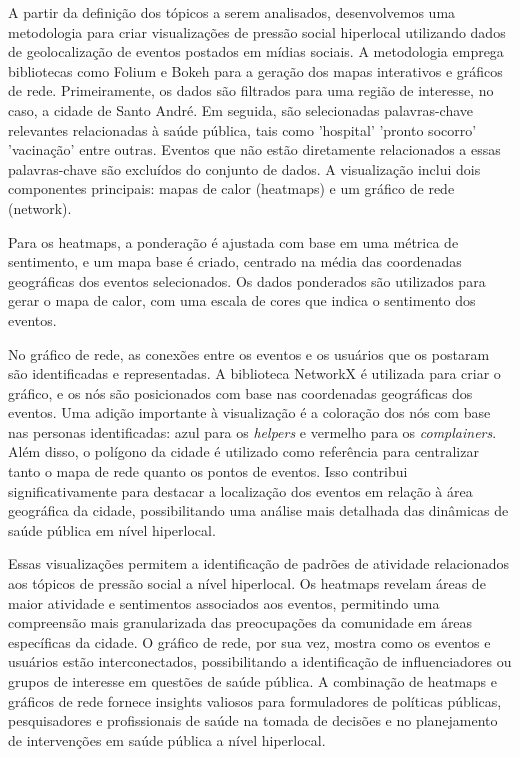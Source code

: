A partir da definição dos tópicos a serem analisados, desenvolvemos uma metodologia para criar visualizações de pressão social hiperlocal utilizando dados de geolocalização de eventos postados em mídias sociais. A metodologia emprega bibliotecas como Folium e Bokeh para a geração dos mapas interativos e gráficos de rede. Primeiramente, os dados são filtrados para uma região de interesse, no caso, a cidade de Santo André. Em seguida, são selecionadas palavras-chave relevantes relacionadas à saúde pública, tais como 'hospital' 'pronto socorro' 'vacinação' entre outras. Eventos que não estão diretamente relacionados a essas palavras-chave são excluídos do conjunto de dados. A visualização inclui dois componentes principais: mapas de calor (heatmaps) e um gráfico de rede (network).

Para os heatmaps, a ponderação é ajustada com base em uma métrica de sentimento, e um mapa base é criado, centrado na média das coordenadas geográficas dos eventos selecionados. Os dados ponderados são utilizados para gerar o mapa de calor, com uma escala de cores que indica o sentimento dos eventos.

No gráfico de rede, as conexões entre os eventos e os usuários que os postaram são identificadas e representadas. A biblioteca NetworkX é utilizada para criar o gráfico, e os nós são posicionados com base nas coordenadas geográficas dos eventos. Uma adição importante à visualização é a coloração dos nós com base nas personas identificadas: azul para os \textit{helpers}  e vermelho para os \textit{complainers}. Além disso, o polígono da cidade é utilizado como referência para centralizar tanto o mapa de rede quanto os pontos de eventos. Isso contribui significativamente para destacar a localização dos eventos em relação à área geográfica da cidade, possibilitando uma análise mais detalhada das dinâmicas de saúde pública em nível hiperlocal.

Essas visualizações permitem a identificação de padrões de atividade relacionados aos tópicos de pressão social a nível hiperlocal. Os heatmaps revelam áreas de maior atividade e sentimentos associados aos eventos, permitindo uma compreensão mais granularizada das preocupações da comunidade em áreas específicas da cidade. O gráfico de rede, por sua vez, mostra como os eventos e usuários estão interconectados, possibilitando a identificação de influenciadores ou grupos de interesse em questões de saúde pública. A combinação de heatmaps e gráficos de rede fornece insights valiosos para formuladores de políticas públicas, pesquisadores e profissionais de saúde na tomada de decisões e no planejamento de intervenções em saúde pública a nível hiperlocal.

